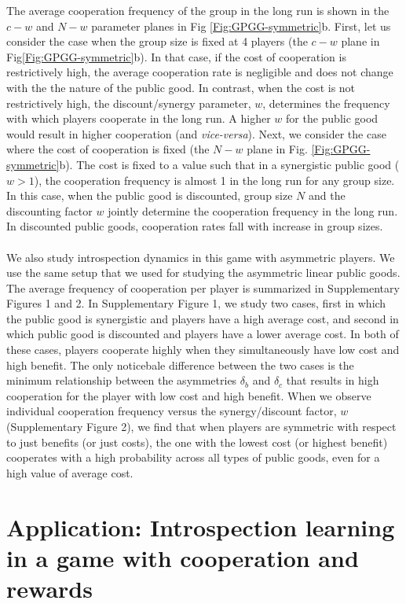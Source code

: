 \documentclass[11pt]{article}
\theoremstyle{plainCl1}
\theoremstyle{plainCl2}
\begin{document}
\noindent The average cooperation frequency of the group in the long run is shown in the $c-w$ and $N-w$ parameter planes in Fig \ref{Fig:GPGG-symmetric}b. First, let us consider the case when the group size is fixed at 4 players (the $c-w$ plane in Fig\ref{Fig:GPGG-symmetric}b). In that case, if the cost of cooperation is restrictively high, the average cooperation rate is negligible and does not change with the the nature of the public good. In contrast, when the cost is not restrictively high, the discount/synergy parameter, $w$, determines the frequency with which players cooperate in the long run. A higher $w$ for the public good would result in higher cooperation (and \emph{vice-versa}). Next, we consider the case where the cost of cooperation is fixed (the $N-w$ plane in Fig. \ref{Fig:GPGG-symmetric}b). The cost is fixed to a value such that in a synergistic public good ($w > 1$), the cooperation frequency is almost 1 in the long run for any group size. In this case, when the public good is discounted, group size $N$ and the discounting factor $w$ jointly determine the cooperation frequency in the long run. In discounted public goods, cooperation rates fall with increase in group sizes.\\ \\
\noindent 
We also study introspection dynamics in this game with asymmetric players. We use the same setup that we used for studying the asymmetric linear public goods. The average frequency of cooperation per player is summarized in Supplementary Figures 1 and 2. In Supplementary Figure 1, we study two cases, first in which the public good is synergistic and players have a high average cost, and second in which public good is discounted and players have a lower average cost. In both of these cases, players cooperate highly when they simultaneously have low cost and high benefit. The only noticebale difference between the two cases is the minimum relationship between the asymmetries $\delta_b$ and $\delta_c$ that results in high cooperation for the player with low cost and high benefit. When we observe individual cooperation frequency versus the synergy/discount factor, $w$ (Supplementary Figure 2), we find that when players are symmetric with respect to just benefits (or just costs), the one with the lowest cost (or highest benefit) cooperates with a high probability across all types of public goods, even for a high value of average cost.

\section*{Application: Introspection learning in a game with cooperation and rewards}
\end{document}
